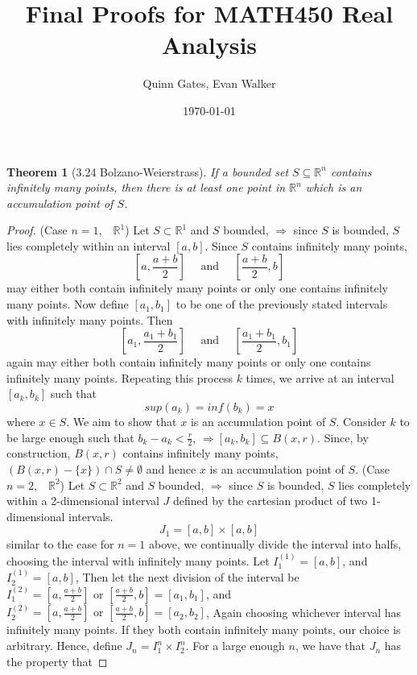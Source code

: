 \documentclass[aps,pra,notitlepage,amsmath,amssymb,letterpaper,12pt]{revtex4-1}
\newtheorem{theorem}{Theorem}
\begin{document}
\title{Final Proofs for MATH450 Real Analysis}
\author{Quinn Gates, Evan Walker}
\date{\today}

\maketitle


\begin{theorem}[3.24 Bolzano-Weierstrass]
If a bounded set $S \subseteq \mathbb{R}^n$ contains infinitely many points, then there is at least one point in $\mathbb{R}^n$ which is an accumulation point of $S$.
\end{theorem}

\begin{proof}
(Case $n=1$,$\quad \mathbb{R}^{1}$)
Let $S \subset \mathbb{R}^{1}$ and $S$ bounded, $\Rightarrow$ since $S$ is bounded, $S$ lies completely within an interval $[a,b]$. Since $S$ contains infinitely many points,
$$[a,\frac{a+b}{2}] \quad \textrm{ and }  \quad [\frac{a+b}{2},b]$$
may either both contain infinitely many points or only one contains infinitely many points. Now define $[a_{1},b_{1}]$ to be one of the previously stated intervals with infinitely many points. Then
$$[a_{1},\frac{a_{1}+b_{1}}{2}] \quad \textrm{ and }  \quad [\frac{a_{1}+b_{1}}{2},b_{1}]$$
again may either both contain infinitely many points or only one contains infinitely many points. Repeating this process $k$ times, we arrive at an interval $[a_{k},b_{k}]$
such that $$sup(a_{k}) = inf(b_{k}) = x$$ where $x \in S$. We aim to show that $x$ is an accumulation point of $S$. Consider $k$ to be large enough such that $b_{k} - a_{k} < \frac{r}{2}$, $\Rightarrow [a_{k},b_{k}] \subseteq B(x,r)$. Since, by construction, $B(x,r)$ contains infinitely many points, $(B(x,r) - \{x\}) \cap S \ne \emptyset$ and hence $x$ is an accumulation point of $S$.
\newline{}
\newline{}
(Case $n=2$,$\quad \mathbb{R}^{2}$) Let $S \subset \mathbb{R}^{2}$ and $S$ bounded, $\Rightarrow$ since $S$ is bounded, $S$ lies completely within a 2-dimensional interval $J$ defined by the cartesian product of two 1-dimensional intervals.
$$J_{1} = [a,b] \times [a,b]$$
similar to the case for $n=1$ above, we continually divide the interval into halfs, choosing the interval with infinitely many points. Let $I_{1}^{(1)} = [a,b]$, and $I_{2}^{(1)} = [a,b]$, Then let the next division of the interval be $I_{1}^{(2)} = [a,\frac{a+b}{2}] \textrm{ or } [\frac{a+b}{2},b] = [a_{1},b_{1}]$, and $I_{2}^{(2)} = [a,\frac{a+b}{2}] \textrm{ or } [\frac{a+b}{2},b] = [a_{2},b_{2}]$, Again choosing whichever interval has infinitely many points. If they both contain infinitely many points, our choice is arbitrary. Hence, define $J_{n} = I_{1}^{n} \times I_{2}^{n}$. For a large enough $n$, we have that $J_{n}$ has the property that

\end{proof}
\end{document}
